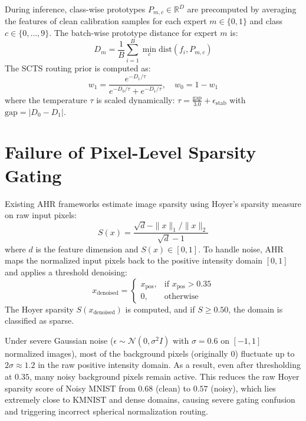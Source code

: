 \documentclass{article}
\theoremstyle{plain}
\theoremstyle{definition}
\theoremstyle{remark}
\begin{document}
During inference, class-wise prototypes $P_{m,c} \in \mathbb{R}^D$ are precomputed by averaging the features of clean calibration samples for each expert $m \in \{0, 1\}$ and class $c \in \{0, \dots, 9\}$. The batch-wise prototype distance for expert $m$ is:
\begin{equation}
  D_m = \frac{1}{B} \sum_{i=1}^B \min_c \text{dist}(f_i, P_{m,c})
\end{equation}
The SCTS routing prior is computed as:
\begin{equation}
  w_1 = \frac{e^{-D_1/\tau}}{e^{-D_0/\tau} + e^{-D_1/\tau}}, \quad w_0 = 1 - w_1
\end{equation}
where the temperature $\tau$ is scaled dynamically: $\tau = \frac{\text{gap}}{3.0} + \epsilon_{\text{stab}}$ with $\text{gap} = |D_0 - D_1|$.

\section{Failure of Pixel-Level Sparsity Gating}
\label{submission-failure}

Existing AHR frameworks estimate image sparsity using Hoyer's sparsity measure on raw input pixels:
\begin{equation}
  S(x) = \frac{\sqrt{d} - \|x\|_1 / \|x\|_2}{\sqrt{d} - 1}
\end{equation}
where $d$ is the feature dimension and $S(x) \in [0, 1]$. To handle noise, AHR maps the normalized input pixels back to the positive intensity domain $[0, 1]$ and applies a threshold denoising:
\begin{equation}
  x_{\text{denoised}} = \begin{cases} x_{\text{pos}}, & \text{if } x_{\text{pos}} > 0.35 \\ 0, & \text{otherwise} \end{cases}
\end{equation}
The Hoyer sparsity $S(x_{\text{denoised}})$ is computed, and if $S \ge 0.50$, the domain is classified as sparse.

Under severe Gaussian noise ($\epsilon \sim \mathcal{N}(0, \sigma^2 I)$ with $\sigma = 0.6$ on $[-1, 1]$ normalized images), most of the background pixels (originally 0) fluctuate up to $2 \sigma \approx 1.2$ in the raw positive intensity domain. As a result, even after thresholding at $0.35$, many noisy background pixels remain active. This reduces the raw Hoyer sparsity score of Noisy MNIST from $0.68$ (clean) to $0.57$ (noisy), which lies extremely close to KMNIST and dense domains, causing severe gating confusion and triggering incorrect spherical normalization routing.
\end{document}
